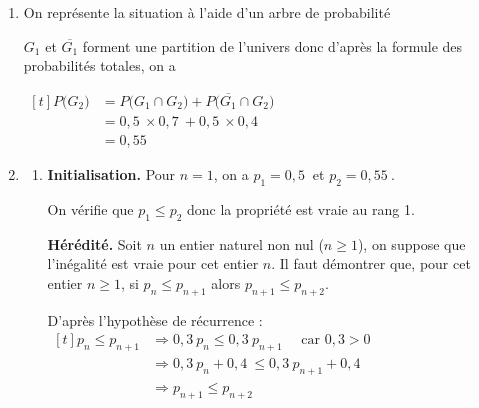 \documentclass[10pt]{article}
\providecommand{\np}[2][]{{#2~#1}}
\begin{document}
	\begin{enumerate}
		\item On représente la situation à l'aide d'un arbre de probabilité
		\begin{center}
		\end{center}
		$G_1$ et $\overline{G_1}$ forment une partition de l'univers donc d'après la formule des probabilités totales, on a

		$\begin{aligned}[t] P\big( G_2 \big) &= P \big( G_1 \cap G_2 \big) + P \big( \overline{G_1} \cap G_2 \big)\\
		& = \np{0,5} \times \np{0,7} + \np{0,5} \times \np{0,4}\\
		& = \np{0,55}
		\end{aligned}$

		\item \begin{enumerate}
			\item \textbf{Initialisation.} Pour $n=1$, on a $p_1=\np{0,5}$ et $p_2=\np{0,55}$.

			On vérifie que $p_1 \leqslant p_2$ donc la propriété est vraie au rang 1.

			\textbf{Hérédité.} Soit $n$ un entier naturel non nul ($n\geqslant 1$), on suppose que l'inégalité est vraie pour cet entier $n$.
			Il faut démontrer que, pour cet entier $n \geqslant 1$, si $p_n \leqslant p_{n+1}$ alors $p_{n+1} \leqslant p_{n+2}$.

			D'après l'hypothèse de récurrence :\quad
			$\begin{aligned}[t] p_n \leqslant p_{n+1}
			& \Longrightarrow \np{0,3} p_n \leqslant \np{0,3} p_{n+1}\quad \text{ car }0,3 > 0\\
			& \Longrightarrow \np{0,3} p_n +\np{0,4} \leqslant \np{0,3} p_{n+1} + \np{0,4} \\
			& \Longrightarrow p_{n+1} \leqslant p_{n+2}
			\end{aligned}$


\end{enumerate}
\end{enumerate}
\end{document}
